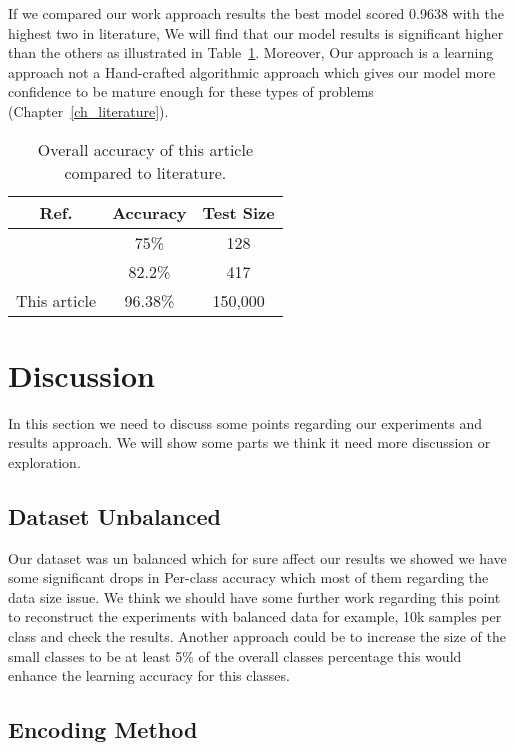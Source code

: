 If we compared our work approach results the best model scored 0.9638 with the highest two in literature, We will find that our model results is significant higher than the others as illustrated in Table~\ref{tab:summ-results}. Moreover, Our approach is a learning approach not a Hand-crafted algorithmic approach which gives our model more confidence to be mature enough for these types of problems (Chapter~\ref{ch_literature}).

\begin{table}[!tb]
  \centering
  \begin{tabular}{c c c}
    \toprule
    \textbf{Ref.}& \textbf{Accuracy}& \textbf{Test Size} \\
    \midrule
    \cite{Alnagdawi2013FindingArabicPoemMeter}   & 75\%     & 128\\
    \cite{Abuata2016RuleBasedAlgorithmFor}      & 82.2\%   & 417  \\
    This article   & 96.38\%  & 150,000 \\
    \bottomrule
  \end{tabular}
  \caption{Overall accuracy of this article compared to literature.}\label{tab:summ-results}
\end{table}


\newpage
\section{Discussion}\label{sec_discussion}

In this section we need to discuss some points regarding our experiments and results approach. We will show some parts we think it need more discussion or exploration.


\subsection{Dataset Unbalanced}

Our dataset was un balanced which for sure affect our results we showed we have some significant drops in Per-class accuracy which most of them regarding the data size issue. We think we should have some further work regarding this point to reconstruct the experiments with balanced data for example, 10k samples per class and check the results. Another approach could be to increase the size of the small classes to be at least 5\% of the overall classes percentage this would enhance the learning accuracy for this classes.
  
\subsection{Encoding Method}

